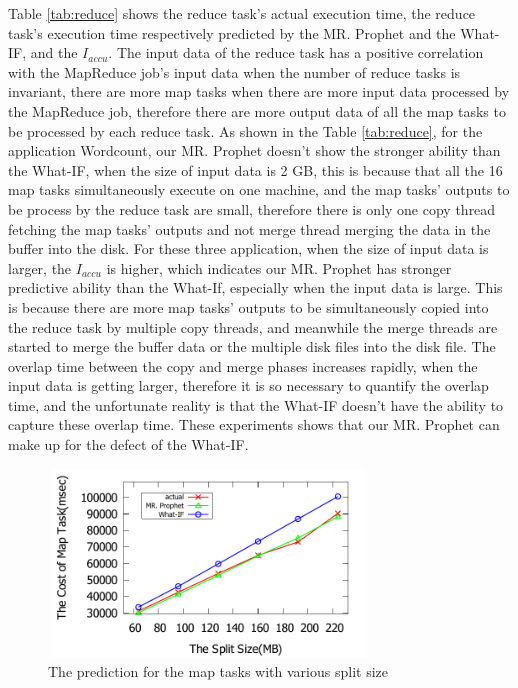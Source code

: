 Table \ref{tab:reduce} shows the reduce task's actual execution time, the reduce task's execution time respectively predicted by the MR. Prophet and the What-IF, and the $I_{accu}$. The input data of the reduce task has a positive correlation with the MapReduce job's input data when the number of reduce tasks is invariant, there are more map tasks when there are more input data processed by the MapReduce job, therefore there are more output data of all the map tasks to be processed by each reduce task.  As shown in the Table \ref{tab:reduce}, for the application Wordcount, our MR. Prophet doesn't show the stronger ability than the What-IF, when the size of input data is 2 GB, this is because that all the 16 map tasks simultaneously execute on one machine, and the map tasks' outputs to be process by the reduce task are small, therefore there is only one copy thread fetching the map tasks' outputs and not merge thread merging the data in the buffer into the disk. For these three application, when the size of input data is larger, the $I_{accu}$ is higher, which indicates our MR. Prophet has stronger predictive ability than the What-If, especially when the input data is large. This is because there are more map tasks' outputs to be simultaneously copied into the reduce task by multiple copy threads, and meanwhile the merge threads are started to merge the buffer data or the multiple disk files into the disk file. The overlap time between the copy and merge phases increases rapidly, when the input data is getting larger, therefore it is so necessary to quantify the overlap time, and the unfortunate reality is that the What-IF doesn't have the ability to capture these overlap time. These experiments shows that our MR. Prophet can make up for the defect of the What-IF.
\begin{figure}[htbp]
\centering
\includegraphics[height=5cm, width=8.5cm]{split}
\caption{The prediction for the map tasks with various split size}
\label{fig:map}
\end{figure}

